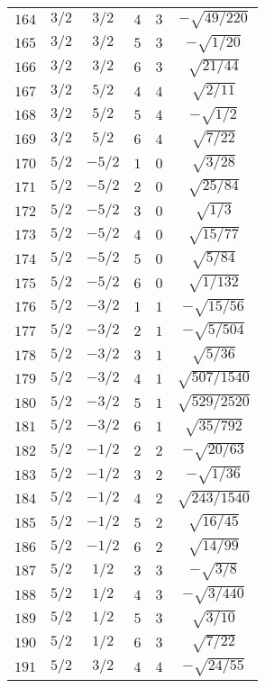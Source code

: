 \begin{table}
\begin{center}
\begin{tabular}{|c|c|c|c|c|c|}
$164$ & $3/2$ & $3/2$ & $4$ & $3$ & $-\sqrt{49/220}$ \\ 
$165$ & $3/2$ & $3/2$ & $5$ & $3$ & $-\sqrt{1/20}$ \\ 
$166$ & $3/2$ & $3/2$ & $6$ & $3$ & $\sqrt{21/44}$ \\ 
$167$ & $3/2$ & $5/2$ & $4$ & $4$ & $\sqrt{2/11}$ \\ 
$168$ & $3/2$ & $5/2$ & $5$ & $4$ & $-\sqrt{1/2}$ \\ 
$169$ & $3/2$ & $5/2$ & $6$ & $4$ & $\sqrt{7/22}$ \\ 
$170$ & $5/2$ & $-5/2$ & $1$ & $0$ & $\sqrt{3/28}$ \\ 
$171$ & $5/2$ & $-5/2$ & $2$ & $0$ & $\sqrt{25/84}$ \\ 
$172$ & $5/2$ & $-5/2$ & $3$ & $0$ & $\sqrt{1/3}$ \\ 
$173$ & $5/2$ & $-5/2$ & $4$ & $0$ & $\sqrt{15/77}$ \\ 
$174$ & $5/2$ & $-5/2$ & $5$ & $0$ & $\sqrt{5/84}$ \\ 
$175$ & $5/2$ & $-5/2$ & $6$ & $0$ & $\sqrt{1/132}$ \\ 
$176$ & $5/2$ & $-3/2$ & $1$ & $1$ & $-\sqrt{15/56}$ \\ 
$177$ & $5/2$ & $-3/2$ & $2$ & $1$ & $-\sqrt{5/504}$ \\ 
$178$ & $5/2$ & $-3/2$ & $3$ & $1$ & $\sqrt{5/36}$ \\ 
$179$ & $5/2$ & $-3/2$ & $4$ & $1$ & $\sqrt{507/1540}$ \\ 
$180$ & $5/2$ & $-3/2$ & $5$ & $1$ & $\sqrt{529/2520}$ \\ 
$181$ & $5/2$ & $-3/2$ & $6$ & $1$ & $\sqrt{35/792}$ \\ 
$182$ & $5/2$ & $-1/2$ & $2$ & $2$ & $-\sqrt{20/63}$ \\ 
$183$ & $5/2$ & $-1/2$ & $3$ & $2$ & $-\sqrt{1/36}$ \\ 
$184$ & $5/2$ & $-1/2$ & $4$ & $2$ & $\sqrt{243/1540}$ \\ 
$185$ & $5/2$ & $-1/2$ & $5$ & $2$ & $\sqrt{16/45}$ \\ 
$186$ & $5/2$ & $-1/2$ & $6$ & $2$ & $\sqrt{14/99}$ \\ 
$187$ & $5/2$ & $1/2$ & $3$ & $3$ & $-\sqrt{3/8}$ \\ 
$188$ & $5/2$ & $1/2$ & $4$ & $3$ & $-\sqrt{3/440}$ \\ 
$189$ & $5/2$ & $1/2$ & $5$ & $3$ & $\sqrt{3/10}$ \\ 
$190$ & $5/2$ & $1/2$ & $6$ & $3$ & $\sqrt{7/22}$ \\ 
$191$ & $5/2$ & $3/2$ & $4$ & $4$ & $-\sqrt{24/55}$ \\ 

\end{tabular}
\end{center}
\end{table}
